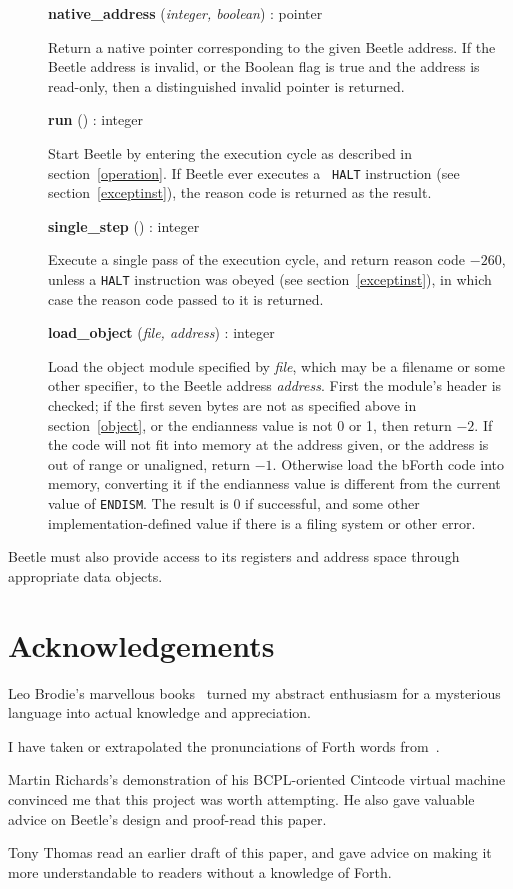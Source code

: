 \documentclass[english]{article}
\newlength{\itemwidth}\itemwidth=\textwidth \advance\itemwidth by -0.1in
\newlength{\pronunc}\pronunc=1.7in
\newlength{\innerwidth}\innerwidth=\itemwidth \advance\innerwidth by -0.5in
\newcommand{\iface}[4]{\item[]\parbox{\itemwidth}{{\bf #1} ({\it #2}\/) :
#3\\[0.5ex]\hspace*{0.4in}\parbox{\innerwidth}{#4}}}
\begin{document}
\begin{description}
\iface{native\_address}{integer, boolean}{pointer}{Return a native pointer corresponding
    to the given Beetle address. If the Beetle address is invalid, or the Boolean flag is true and the address is read-only, then a distinguished invalid pointer is returned.}
\iface{run}{}{integer}{Start Beetle by entering the execution cycle as
    described in section~\ref{operation}. If Beetle ever executes a {\tt
    HALT} instruction (see section~\ref{exceptinst}), the reason code is
    returned as the result.}
\iface{single\_step}{}{integer}{Execute a single pass of the execution
    cycle, and return reason code $-260$, unless a {\tt HALT} instruction was
    obeyed (see section~\ref{exceptinst}), in which case the reason code
    passed to it is returned.}
\iface{load\_object}{file, address}{integer}{Load the object module
    specified by \textit{file}, which may be a filename or some other
    specifier, to the Beetle address \textit{address}. First the module's
    header is checked; if the first seven bytes are not as specified above
    in section~\ref{object}, or the endianness value is not 0 or 1, then
    return $-2$. If the code will not fit into memory at the address given, or
    the address is out of range or unaligned, return $-1$. Otherwise load the bForth code into
    memory, converting it if the endianness value is different from the current
    value of {\tt ENDISM}. The result is 0 if successful, and some other
    implementation-defined value if there is a filing system or other error.}
\end{description}

Beetle must also provide access to its registers and address space through
appropriate data objects.


\section*{Acknowledgements}

Leo Brodie's marvellous books~\cite{starting4th,thinking4th} turned my abstract
enthusiasm for a mysterious language into actual knowledge and appreciation.

I have taken or extrapolated the pronunciations of Forth words from~\cite{ANSIforth}.

Martin Richards's demonstration of his BCPL-oriented Cintcode virtual machine
convinced me that this project was worth attempting. He also gave valuable
advice on Beetle's design and proof-read this paper.

Tony Thomas read an earlier draft of this paper, and gave advice on making it
more understandable to readers without a knowledge of Forth.




\end{document}
